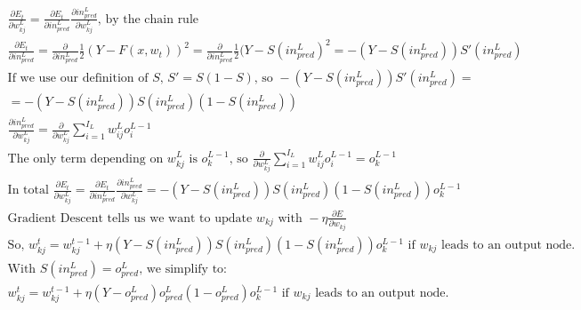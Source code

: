 \documentclass[11pt]{article}
\begin{document}
\begin{gather*}
\frac{\partial E_{t}}{\partial w_{kj}^{L}} = 
\frac{\partial E_{t}}{\partial in_{pred}^{L}} 
\frac{\partial in_{pred}^{L}}{\partial w_{kj}^{L}}
\text{, by the chain rule}\\
\frac{\partial E_{t}}{\partial in_{pred}^{L}} = 
\frac{\partial}{\partial in_{pred}^{L}} \frac{1}{2} (Y - F(x, w_{t}))^{2} = 
\frac{\partial}{\partial in_{pred}^{L}} \frac{1}{2} (Y - S(in_{pred}^{L})^{2} = 
- (Y - S(in_{pred}^{L})) S'(in_{pred}^{L})\\
\text{If we use our definition of } S \text{, } S' = S (1 - S) \text{, so } 
- (Y - S(in_{pred}^{L})) S'(in_{pred}^{L}) = \\
= - (Y - S(in_{pred}^{L})) S(in_{pred}^{L}) (1 - S(in_{pred}^{L}))\\
\frac{\partial in_{pred}^{L}}{\partial w_{kj}^{L}} = 
\frac{\partial}{\partial w_{kj}^{L}} 
\sum_{i = 1}^{I_{L}} w_{ij}^{L} o_{i}^{L - 1}\\
\text{The only term depending on } w_{kj}^{L} \text{ is } o_{k}^{L - 1} 
\text{, so } 
\frac{\partial}{\partial w_{kj}^{L}} 
\sum_{i = 1}^{I_{L}} w_{ij}^{L} o_{i}^{L - 1} = 
o_{k}^{L - 1}\\
\text{In total } 
\frac{\partial E_{t}}{\partial w_{kj}^{L}} = 
\frac{\partial E_{t}}{\partial in_{pred}^{L}} 
\frac{\partial in_{pred}^{L}}{\partial w_{kj}^{L}} = 
- (Y - S(in_{pred}^{L})) S(in_{pred}^{L}) (1 - S(in_{pred}^{L})) o_{k}^{L - 1}\\
\text{Gradient Descent tells us we want to update } w_{kj} \text{ with } 
- \eta \frac{\partial E}{\partial w_{kj}}\\
\text{So, } w_{kj}^{t} = w_{kj}^{t - 1} + 
\eta (Y - S(in_{pred}^{L})) S(in_{pred}^{L}) (1 - S(in_{pred}^{L})) o_{k}^{L - 1} 
\text{ if } w_{kj} \text{ leads to an output node.}\\
\text{With } S(in_{pred}^{L}) = o_{pred}^{L} \text{, we simplify to:}\\
w_{kj}^{t} = w_{kj}^{t - 1} + 
\eta (Y - o_{pred}^{L}) o_{pred}^{L} (1 - o_{pred}^{L}) o_{k}^{L - 1} 
\text{ if } w_{kj} \text{ leads to an output node.}
\end{gather*}
\end{document}
